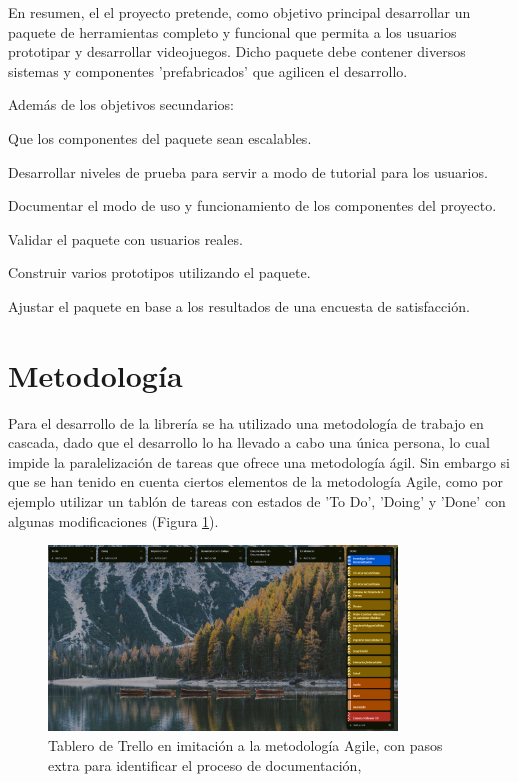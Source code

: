En resumen, el el proyecto pretende, como objetivo principal desarrollar un paquete de herramientas completo y funcional que permita a los usuarios prototipar y 
 desarrollar videojuegos. Dicho paquete debe contener diversos sistemas y componentes 'prefabricados' que agilicen el desarrollo. 

Además de los objetivos secundarios:
\begin{compactitem}
  \item Que los componentes del paquete sean escalables.
  \item Desarrollar niveles de prueba para servir a modo de tutorial para los usuarios.
  \item Documentar el modo de uso y funcionamiento de los componentes del proyecto.
  \item Validar el paquete con usuarios reales.
  \item Construir varios prototipos utilizando el paquete.
  \item Ajustar el paquete en base a los resultados de una encuesta de satisfacción.
\end{compactitem}

\section{Metodología}
Para el desarrollo de la librería se ha utilizado una metodología de trabajo en cascada, dado que el desarrollo lo ha llevado a cabo una única persona, lo cual
impide la paralelización de tareas que ofrece una metodología ágil. Sin embargo si que se han tenido en cuenta ciertos elementos de la metodología Agile, como 
por ejemplo utilizar un tablón de tareas con estados de 'To Do', 'Doing' y 'Done' con algunas modificaciones (Figura \ref{fig:trello}).

\begin{figure}[H]
  \centering
	\includegraphics[width=350px,clip=true]{trello2.png}
  \caption{Tablero de Trello en imitación a la metodología Agile, con pasos extra para identificar el proceso de documentación,}
  \label{fig:trello}
\end{figure}

